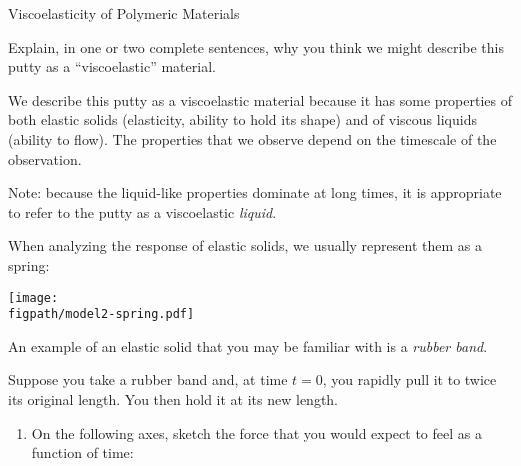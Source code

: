 \begin{activity}{Viscoelasticity of Polymeric Materials}
\begin{ctqs}
	\question Explain, in one or two complete sentences, why you think we might describe this putty as a ``viscoelastic'' material.
	
			\begin{solution}[2in]
			
				We describe this putty as a viscoelastic material because it  has some properties of both elastic solids (elasticity, ability to hold its shape) and of viscous liquids (ability to flow).  The properties that we observe depend on the timescale of the observation.
				
				Note: because the liquid-like properties dominate at long times, it is appropriate to refer to the putty as a viscoelastic \emph{liquid}.
				
			\end{solution}
		
\end{ctqs}

\begin{model}

	When analyzing the response of elastic solids, we usually represent them as a spring:
	
	\vspace{3pt}
	\centerline{\texttt{[image: \\figpath/model2-spring.pdf]}}
	
	An example of an elastic solid that you may be familiar with is a \emph{rubber band}.
	
\end{model}

\begin{ctqs}
	\question Suppose you take a rubber band and, at time $t=0$, you rapidly pull it to twice its original length. You then hold it at its new length. \label{\labelbase:ctq:rubberbandstepstrain}
	
		\begin{enumerate}
			\item On the following axes, sketch the force that you would expect to feel as a function of time:
			
				\begin{solution}[1.5in]
				\end{solution}
			

\end{enumerate}
\end{ctqs}
\end{activity}
